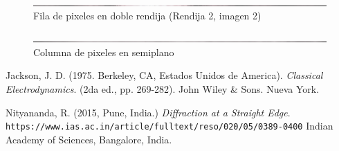 \documentclass[12p]{article}
\begin{document}
\begin{figure}[h]
  \includegraphics[width=1.0\textwidth]{bp.png}
  \centering
  \caption{Fila de pixeles en doble rendija (Rendija 2, imagen 2)}
\end{figure}

\begin{figure}[h]
  \includegraphics[width=1.0\textwidth]{spp.png}
  \centering
  \caption{Columna de pixeles en semiplano}
\end{figure} 



\begin{thebibliography}{9}

Jackson, J. D. (1975. Berkeley, CA, Estados Unidos de America).
\textit{Classical Electrodynamics}. 
  (2da ed., pp. 269-282). John Wiley \& Sons. Nueva York.


Nityananda, R. (2015, Pune, India.)
\textit{Diffraction at a Straight Edge}. 
\\\texttt{https://www.ias.ac.in/article/fulltext/reso/020/05/0389-0400}
Indian Academy of Sciences, Bangalore, India.



\end{thebibliography}
 
\end{document}
